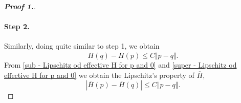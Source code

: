 \documentclass[12pt, oneside]{amsart}  	%
\begin{document}
\begin{proof}[\textbf{Proof 1.}]
\paragraph{\textbf{Step 2.}} Similarly, doing quite similar to step 1, we obtain
\begin{equation}\label{super - Lipschitz od effective H for p and 0}
\overline{H}(q) - \overline{H}(p) \leq C\Vert p-q\Vert.
\end{equation}
From \eqref{sub - Lipschitz od effective H for p and 0} and \eqref{super - Lipschitz od effective H for p and 0} we obtain the Lipschitz's property of $\overline{H}$,
\begin{equation*}
|\overline{H}(p) - \overline{H}(q)|\leq C\Vert p-q\Vert.
\end{equation*}
\vspace*{0.2cm}


\end{proof}
\end{document}

